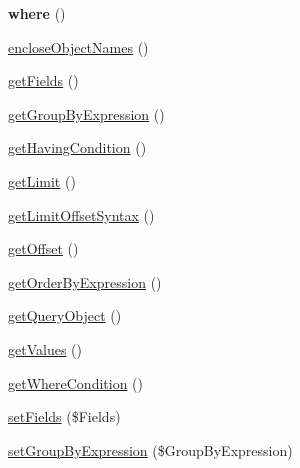 \begin{DoxyCompactItemize}
\item 
\hypertarget{class_able_polecat___query_language___statement_abstract_a67ecf76c1603c22a9f286e71d3f2c2d2}{}{\bfseries where} ()\label{class_able_polecat___query_language___statement_abstract_a67ecf76c1603c22a9f286e71d3f2c2d2}

\item 
\hyperlink{class_able_polecat___query_language___statement_abstract_a1267392dd4d0f632a802b47d3710b500}{enclose\+Object\+Names} ()
\item 
\hyperlink{class_able_polecat___query_language___statement_abstract_aff667c8e7e2da76ea9ba77bc12f20027}{get\+Fields} ()
\item 
\hyperlink{class_able_polecat___query_language___statement_abstract_ac2bbbefa31d6084bcd05a65db39cb1e9}{get\+Group\+By\+Expression} ()
\item 
\hyperlink{class_able_polecat___query_language___statement_abstract_ac7eaee79364037e1022e73711a69346d}{get\+Having\+Condition} ()
\item 
\hyperlink{class_able_polecat___query_language___statement_abstract_adc86593a522f6adc4e47b02b97a6f8d0}{get\+Limit} ()
\item 
\hyperlink{class_able_polecat___query_language___statement_abstract_aa9746fe393198c839c3c7a877a88e202}{get\+Limit\+Offset\+Syntax} ()
\item 
\hyperlink{class_able_polecat___query_language___statement_abstract_aee8782a6009ae7e59aef9d88588d498a}{get\+Offset} ()
\item 
\hyperlink{class_able_polecat___query_language___statement_abstract_a38c676ed3ee963cfc7f683912649613e}{get\+Order\+By\+Expression} ()
\item 
\hyperlink{class_able_polecat___query_language___statement_abstract_a6e031402d8fc1663acfea2cb1ef50a37}{get\+Query\+Object} ()
\item 
\hyperlink{class_able_polecat___query_language___statement_abstract_a70a0fe08035189260c72e32a9e20d30c}{get\+Values} ()
\item 
\hyperlink{class_able_polecat___query_language___statement_abstract_aeaf20b24afa61556f8189bf603610173}{get\+Where\+Condition} ()
\item 
\hyperlink{class_able_polecat___query_language___statement_abstract_af78faf9e078fada0bd0fb9cf929ce77b}{set\+Fields} (\$Fields)
\item 
\hyperlink{class_able_polecat___query_language___statement_abstract_a7f6cac2087076e2374cdc92e0710634e}{set\+Group\+By\+Expression} (\$Group\+By\+Expression)

\end{DoxyCompactItemize}
